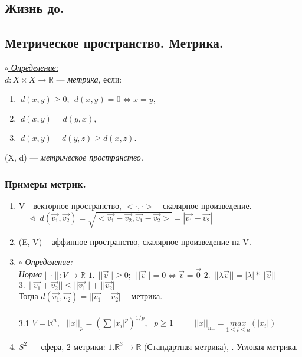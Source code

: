 \documentclass[10pt]{report}
\begin{document}
 
 \begin{spacing}{1.5}
\newpage
     
    \tableofcontents
    \newpage
\chapter{Жизнь до.}
\section{Метрическое пространство. Метрика.}
\underline{\textit{$\circ$ Определение:}}\\

  $d: X \times X\rightarrow \mathbb{R}$ --- \emph{\textit{метрика}}, если:
 \begin{enumerate}
\item $~d\left( x, y\right)\geq 0;~~ d\left( x, y\right) = 0\Longleftrightarrow x=y ,$
\item $~d\left( x, y\right)=d\left( y, x\right) ,$
\item $~d\left( x, y\right)+d\left( y, z\right)\geq d(x, z) .$

\end{enumerate}
 (X, d) --- \textit{метрическое пространство.}
 \\
 \subsection{Примеры метрик.}

 \begin{enumerate}
\item V - векторное пространство, $<\cdot , \cdot >$ - скалярное произведение.
 \\$ ~~~~~~\sphericalangle ~~d(\vec{v_{1}}, \vec{v_{2}}) = \sqrt{<\vec{v_{1}} - \vec{v_{2}},\vec{v_{1}} - \vec{v_{2}}> } = |\vec{v_{1}} - \vec{v_{2}}|$
 \item (E, V) -- аффинное пространство, скалярное произведение на V.
 \item \emph{$\circ$ Определение:}\\
 \emph{Норма }$||\cdot||: V\rightarrow  \mathbb{R}$
 \subitem $1. ~~||\vec{v}||\geq 0 ; ~~||\vec{v}|| = 0 \Longleftrightarrow \vec{v} = \vec{0} $
 \subitem $ 2. ~~||\lambda\vec{v}|| = |\lambda|*||\vec{v}|| $
 \subitem $ 3.~~||\vec{v_{1}} + \vec{v_{2}} ||\leq || \vec{v_{1}} || + ||\vec{v_{2}}||$
 \\Тогда $d(\vec{v_{1}}, \vec{v_{2}}) = ||\vec{v_{1}} - \vec{v_{2}}||$ - метрика.
 \\ \\3.1 $V = \mathbb{R}^{n} ,~~~ ||x||_{p} = (\sum |x_{i}|^{p})^{1/p},~~~ p\geq 1$
 \subsubitem $~~~~~~~~~~||x||_{\inf}=\underset{1\leq i\leq n}{max}(|x_{i}|)$
 \item $S^{2}$ --- сфера, 2 метрики:
 \subsubitem $1. \mathbb{R}^{3}\rightarrow \mathbb{R}$ (Стандартная метрика),
 . Угловая метрика.
\end{enumerate}
\end{spacing}
\newpage
\end{document}
